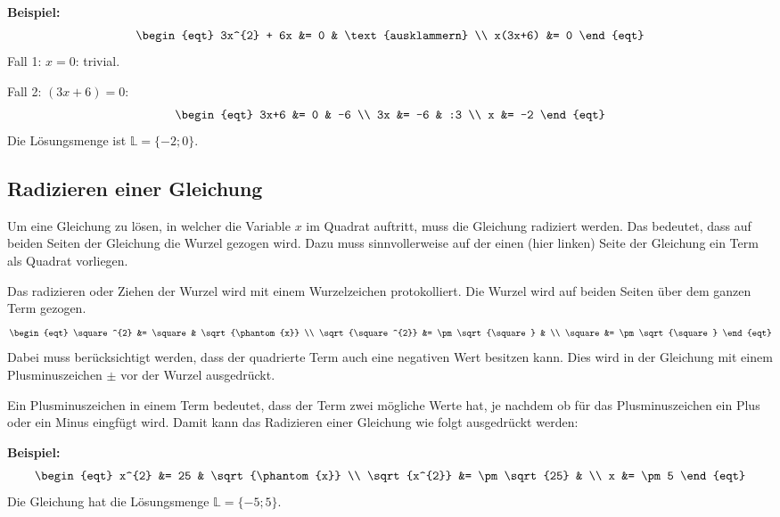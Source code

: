 \begin{example}
  \textbf{Beispiel:}
  \[\begin{eqt}
    3x^{2} + 6x &= 0 & \text{ausklammern} \\
        x(3x+6) &= 0
  \end{eqt}\]
  Fall 1: $x = 0$: trivial.

  Fall 2: $(3x+6) = 0$:
  \[\begin{eqt}
    3x+6 &= 0  & -6 \\
      3x &= -6 & :3 \\
       x &= -2
  \end{eqt}\]
  Die Lösungsmenge ist $\mathbb{L} = \{-2;0\}$.
\end{example}


\subsection{Radizieren einer Gleichung}

Um eine Gleichung zu lösen, in welcher die Variable $x$ im Quadrat auftritt, muss die Gleichung radiziert werden. Das bedeutet, dass auf beiden Seiten der Gleichung die Wurzel gezogen wird. Dazu muss sinnvollerweise auf der einen (hier linken) Seite der Gleichung ein Term als Quadrat vorliegen.

Das radizieren oder Ziehen der Wurzel wird mit einem Wurzelzeichen protokolliert. Die Wurzel wird auf beiden Seiten über dem ganzen Term gezogen.
\[\begin{eqt}
           \square^{2} &= \square           & \sqrt{\phantom{x}} \\
    \sqrt{\square^{2}} &= \pm\sqrt{\square} & \\
               \square &= \pm\sqrt{\square}
\end{eqt}\]
Dabei muss berücksichtigt werden, dass der quadrierte Term auch eine negativen Wert besitzen kann. Dies wird in der Gleichung mit einem Plusminuszeichen $\pm$ vor der Wurzel ausgedrückt.

Ein Plusminuszeichen in einem Term bedeutet, dass der Term zwei mögliche Werte hat, je nachdem ob für das Plusminuszeichen ein Plus oder ein Minus eingfügt wird. Damit kann das Radizieren einer Gleichung wie folgt ausgedrückt werden:

\begin{example}
  \textbf{Beispiel:}
  \[\begin{eqt}
           x^{2} &= 25        & \sqrt{\phantom{x}} \\
    \sqrt{x^{2}} &= \pm\sqrt{25} & \\
               x &= \pm 5
  \end{eqt}\]
  Die Gleichung hat die Lösungsmenge $\mathbb{L} = \{-5;5\}$.
\end{example}

